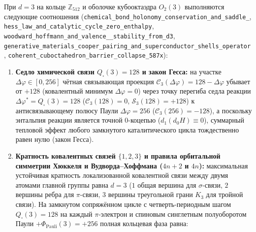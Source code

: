 \begin{theorem}
\label{thm:mono-chem-cooper-587}
При $d = 3$ на кольце $\mathbb{Z}_{512}$ и оболочке кубооктаэдра $O_2(3)$ выполняются следующие соотношения (\texttt{chemical\_\allowbreak bond\_\allowbreak holonomy\_\allowbreak conservation\_\allowbreak and\_\allowbreak saddle\_}, \texttt{hess\_\allowbreak law\_\allowbreak and\_\allowbreak catalytic\_\allowbreak cycle\_\allowbreak zero\_\allowbreak enthalpy}, \texttt{woodward\_\allowbreak hoffmann\_\allowbreak and\_\allowbreak valence\_\_\allowbreak stability\_\allowbreak from\_\allowbreak d3}, \texttt{generative\_\allowbreak materials\_\allowbreak cooper\_\allowbreak pairing\_\allowbreak and\_\allowbreak super\allowbreak conductor\_\allowbreak shells\_\allowbreak operator}, \texttt{coherent\_\allowbreak cub\allowbreak octahedron\_\allowbreak barrier\_\allowbreak collapse\_\allowbreak 587x}):
\begin{enumerate}[label=\textbf{\arabic*.},noitemsep]
\item \textbf{Седло химической связи $Q_\square(3) = 128$ и закон Гесса:}
  на участке $\Delta\varphi \in [0, 256]$ чётная связывающая проекция $\mathcal{C}_3(\Delta\varphi) = 128 - \Delta\varphi$ убывает от $+128$ (ковалентный минимум $\Delta\varphi = 0$) через точку перегиба седла реакции $\Delta\varphi^* = Q_\square(3) = 128$ ($\mathcal{C}_3(128) = 0$, $\mathcal{S}_3(128) = +128$) к антисвязывающему полюсу Паули $\Delta\varphi = 256$ ($\mathcal{C}_3(256) = -128$), а поскольку энтальпия реакции является точной $0$-коцепью ($d_1(d_0 H) \equiv 0$), суммарный тепловой эффект любого замкнутого каталитического цикла тождественно равен нулю (закон Гесса).
\item \textbf{Кратность ковалентных связей $\{1, 2, 3\}$ и правила орбитальной симметрии Хюккеля и Вудворда--Хоффмана ($4n + 2$ и $4n$):}
  максимальная устойчивая кратность локализованной ковалентной связи между двумя атомами главной группы равна $d = 3$ ($1$ общая вершина для $\sigma$-связи, $2$ вершины ребра для $\pi$-связи, $3$ вершины треугольной грани $K_3$ для тройной связи). На замкнутом сопряжённом цикле с четверть-периодным шагом $Q_\square(3) = 128$ на каждый $\pi$-электрон и спиновым синглетным полуоборотом Паули $+\Phi_{\mathrm{Pauli}}(3) = +256$ полная кольцевая фаза равна:
  \begin{equation}
    \label{eq:mono-huckel-ring-phase}

\end{equation}
\end{enumerate}
\end{theorem}
